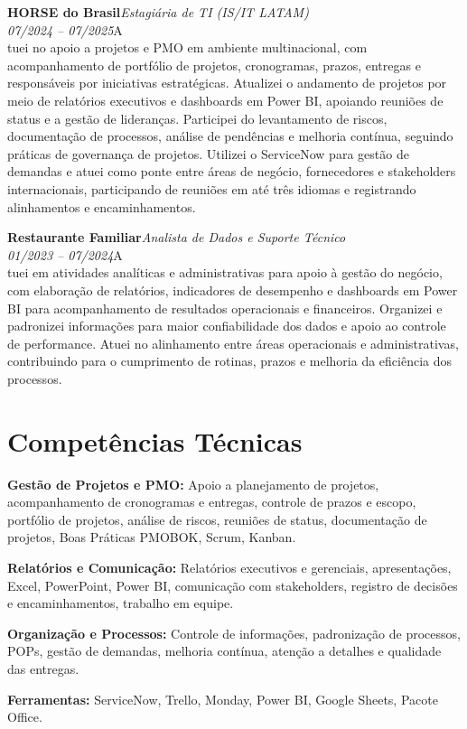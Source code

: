 \documentclass[11pt,a4paper]{article}
\newcommand{\cvrole}[4]{%
  \vspace{4pt}%
  {\bfseries\color{accentcolor}#1}\hfill{\itshape #2}\\[-2pt]%
  {\itshape #3}\hfill #4\\[6pt]%
}
\begin{document}
\cvrole{HORSE do Brasil}{Estagiária de TI (IS/IT LATAM)}{07/2024 -- 07/2025}

Atuei no apoio a projetos e PMO em ambiente multinacional, com acompanhamento de portfólio de projetos, cronogramas, prazos, entregas e responsáveis por iniciativas estratégicas. Atualizei o andamento de projetos por meio de relatórios executivos e dashboards em Power BI, apoiando reuniões de status e a gestão de lideranças. Participei do levantamento de riscos, documentação de processos, análise de pendências e melhoria contínua, seguindo práticas de governança de projetos. Utilizei o ServiceNow para gestão de demandas e atuei como ponte entre áreas de negócio, fornecedores e stakeholders internacionais, participando de reuniões em até três idiomas e registrando alinhamentos e encaminhamentos.

\cvrole{Restaurante Familiar}{Analista de Dados e Suporte Técnico}{01/2023 -- 07/2024}

Atuei em atividades analíticas e administrativas para apoio à gestão do negócio, com elaboração de relatórios, indicadores de desempenho e dashboards em Power BI para acompanhamento de resultados operacionais e financeiros. Organizei e padronizei informações para maior confiabilidade dos dados e apoio ao controle de performance. Atuei no alinhamento entre áreas operacionais e administrativas, contribuindo para o cumprimento de rotinas, prazos e melhoria da eficiência dos processos.

\section{Competências Técnicas}

\textbf{Gestão de Projetos e PMO:} Apoio a planejamento de projetos, acompanhamento de cronogramas e entregas, controle de prazos e escopo, portfólio de projetos, análise de riscos, reuniões de status, documentação de projetos, Boas Práticas PMOBOK, Scrum, Kanban.

\textbf{Relatórios e Comunicação:} Relatórios executivos e gerenciais, apresentações, Excel, PowerPoint, Power BI, comunicação com stakeholders, registro de decisões e encaminhamentos, trabalho em equipe.

\textbf{Organização e Processos:} Controle de informações, padronização de processos, POPs, gestão de demandas, melhoria contínua, atenção a detalhes e qualidade das entregas.

\textbf{Ferramentas:} ServiceNow, Trello, Monday, Power BI, Google Sheets, Pacote Office.
\end{document}
